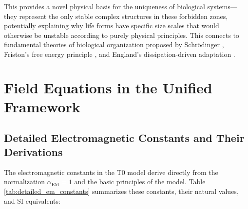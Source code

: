 \documentclass[twocolumn,aps,prl]{revtex4-2}
\begin{document}
	This provides a novel physical basis for the uniqueness of biological systems—they represent the only stable complex structures in these forbidden zones, potentially explaining why life forms have specific size scales that would otherwise be unstable according to purely physical principles. This connects to fundamental theories of biological organization proposed by Schrödinger \cite{Schrodinger1944}, Friston's free energy principle \cite{Friston2010}, and England's dissipation-driven adaptation \cite{England2013}.
	
	\section{Field Equations in the Unified Framework}
	\label{sec:field_equations}
	
	\subsection{Detailed Electromagnetic Constants and Their Derivations}
	\label{subsec:detailed_em_constants}
	
	The electromagnetic constants in the T0 model derive directly from the normalization $\alpha_{\text{EM}} = 1$ and the basic principles of the model. Table \ref{tab:detailed_em_constants} summarizes these constants, their natural values, and SI equivalents:
	
\end{document}
